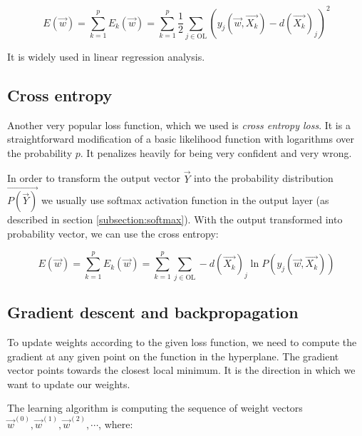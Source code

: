 $$ E(\overrightarrow{w}) = \sum_{k=1}^{p} E_k(\overrightarrow{w}) = \sum_{k=1}^{p} \frac{1}{2} \sum_{j \in \text{OL}} (y_j(\overrightarrow{w}, \overrightarrow{X_k}) - d(\overrightarrow{X_k})_j)^2 $$

\noindent
It is widely used in linear regression analysis.

\subsection*{Cross entropy}

Another very popular loss function, which we used is \textit{cross entropy loss}. It is a straightforward modification of a basic likelihood function with logarithms over the probability $p$. It penalizes heavily for being very confident and very wrong. 

In order to transform the output vector $\overrightarrow{Y}$ into the probability distribution $\overrightarrow{P(\overrightarrow{Y})}$ we usually use softmax activation function in the output layer (as described in section \ref{subsection:softmax}). With the output transformed into probability vector, we can use the cross entropy:

$$ E(\overrightarrow{w}) =  \sum_{k=1}^{p} E_k(\overrightarrow{w}) = \sum_{k=1}^{p} \sum_{j \in \text{OL}} - d(\overrightarrow{X_k})_j \ln{P(y_j(\overrightarrow{w}, \overrightarrow{X_k}))}$$

\subsection{Gradient descent and backpropagation}

To update weights according to the given loss function, we need to compute the gradient at any given point on the function in the hyperplane. The gradient vector points towards the closest local minimum. It is the direction in which we want to update our weights.

The learning algorithm is computing the sequence of weight vectors $\overrightarrow{w}^{(0)}, \overrightarrow{w}^{(1)}, \overrightarrow{w}^{(2)}, \cdots$, where:

